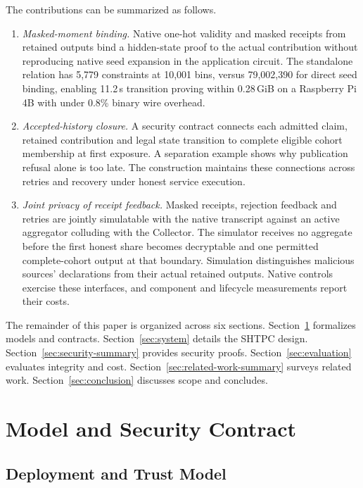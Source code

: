 \documentclass[conference,compsoc]{IEEEtran}
\theoremstyle{definition}
\numberwithin{equation}{section}
\numberwithin{table}{section}
\numberwithin{figure}{section}
\theoremstyle{plain}
\begin{document}
The contributions can be summarized as follows.
\begin{enumerate}
\item \emph{Masked-moment binding.} Native one-hot validity and masked
receipts from retained outputs bind a hidden-state proof to the actual
contribution without reproducing native seed expansion in the application
circuit. The standalone relation has 5,779 constraints at 10,001 bins, versus
79,002,390 for direct seed binding, enabling 11.2\,s transition proving within
0.28\,GiB on a Raspberry Pi 4B with under 0.8\% binary wire overhead.

\item \emph{Accepted-history closure.} A security contract connects each
admitted claim, retained contribution and legal state transition to complete
eligible cohort membership at first exposure. A separation example shows why
publication refusal alone is too late. The construction maintains these
connections across retries and recovery under honest service execution.

\item \emph{Joint privacy of receipt feedback.} Masked receipts, rejection
feedback and retries are jointly simulatable with the native transcript
against an active aggregator colluding with the Collector. The simulator
receives no aggregate before the first honest share becomes decryptable and
one permitted complete-cohort output at that boundary. Simulation distinguishes malicious
sources' declarations from their actual retained outputs. Native controls
exercise these interfaces, and component and lifecycle measurements report
their costs.
\end{enumerate}

The remainder of this paper is organized across six sections. Section~\ref{sec:prelim} formalizes models and contracts. Section~\ref{sec:system} details the SHTPC design. Section~\ref{sec:security-summary} provides security proofs. Section~\ref{sec:evaluation} evaluates integrity and cost. Section~\ref{sec:related-work-summary} surveys related work. Section~\ref{sec:conclusion} discusses scope and concludes.

\section{Model and Security Contract}
\label{sec:prelim}

\subsection{Deployment and Trust Model}
\label{sec:threat}
\end{document}
